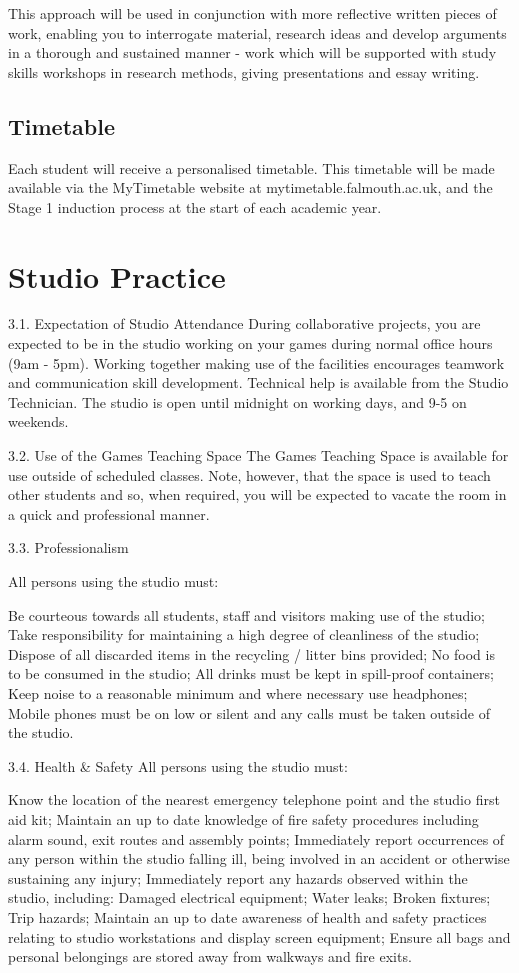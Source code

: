 This approach will be used in conjunction with more reflective written pieces of work, enabling you to interrogate material, research ideas and develop arguments in a thorough and sustained manner - work which will be supported with study skills workshops in research methods, giving presentations and essay writing.

\section{Timetable}

Each student will receive a personalised timetable. This timetable will be made available via the MyTimetable website at mytimetable.falmouth.ac.uk, and the Stage 1 induction process at the start of each academic year.

\chapter{Studio Practice}
\newpage

3.1.	Expectation of Studio Attendance
During collaborative projects, you are expected to be in the studio working on your games during normal office hours (9am - 5pm). Working together making use of the facilities encourages teamwork and communication skill development. Technical help is available from the Studio Technician.  The studio is open until midnight on working days, and 9-5 on weekends.

3.2.	Use of the Games Teaching Space
The Games Teaching Space is available for use outside of scheduled classes. Note, however, that the space is used to teach other students and so, when required, you will be expected to vacate the room in a quick and professional manner.

3.3.	Professionalism

All persons using the studio must:

Be courteous towards all students, staff and visitors making use of the studio;
Take responsibility for maintaining a high degree of cleanliness of the studio;
Dispose of all discarded items in the recycling / litter bins provided;
No food is to be consumed in the studio;
All drinks must be kept in spill-proof containers;
Keep noise to a reasonable minimum and where necessary use headphones;
Mobile phones must be on low or silent and any calls must be taken outside of the studio.

3.4.	Health \& Safety
All persons using the studio must:

Know the location of the nearest emergency telephone point and the studio first aid kit;
Maintain an up to date knowledge of fire safety procedures including alarm sound, exit routes and assembly points;
Immediately report occurrences of any person within the studio falling ill, being involved in an accident or otherwise sustaining any injury;
Immediately report any hazards observed within the studio, including:
Damaged electrical equipment;
Water leaks;
Broken fixtures;
Trip hazards;
Maintain an up to date awareness of health and safety practices relating to studio workstations and display screen equipment;
Ensure all bags and personal belongings are stored away from walkways and fire exits.

